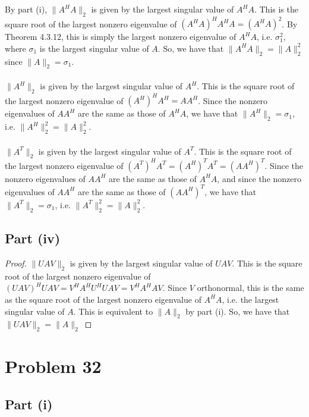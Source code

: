 \documentclass{article}
\begin{document}
By part (i), $\|A^{H}A\|_2$ is given by the largest singular value of $A^{H}A$. This is the square root of the largest nonzero eigenvalue of $(A^{H}A)^{H}A^{H}A = (A^{H}A)^2$. By Theorem 4.3.12, this is simply the largest nonzero eigenvalue of $A^{H}A$, i.e. $\sigma_1^2$, where $\sigma_1$ is the largest singular value of $A$. So, we have that $\|A^{H}A\|_2 = \|A\|_2^2$ since $\|A\|_2 = \sigma_1$. \\
\\
$\|A^{H}\|_2$ is given by the largest singular value of $A^{H}$. This is the square root of the largest nonzero eigenvalue of $(A^{H})^{H}A^{H} = AA^{H}$. Since the nonzero eigenvalues of  $AA^{H}$ are the same as those of $A^{H}A$, we have that $\|A^{H}\|_2 = \sigma_1$, i.e. $\|A^{H}\|_2^2 = \|A\|_2^2$. \\
\\
$\|A^{T}\|_2$ is given by the largest singular value of $A^{T}$. This is the square root of the largest nonzero eigenvalue of $(A^{T})^{H}A^{T} = (A^{H})^{T}A^{T} = (AA^{H})^{T}$. Since the nonzero eigenvalues of  $AA^{H}$ are the same as those of $A^{H}A$, and since the nonzero eigenvalues of $AA^{H}$ are the same as those of $(AA^{H})^{T}$, we have that $\|A^{T}\|_2 = \sigma_1$, i.e. $\|A^{T}\|_2^2 = \|A\|_2^2$. \\

\subsection*{Part (iv)}

\begin{proof}
$\|UAV\|_2$ is given by the largest singular value of $UAV$. This is the square root of the largest nonzero eigenvalue of $(UAV)^{H}UAV = V^{H}A^{H}U^{H}UAV = V^{H}A^{H}AV$. Since $V$ orthonormal, this is the same as the square root of the largest nonzero eigenvalue of $A^{H}A$, i.e. the largest singular value of $A$. This is equivalent to $\|A\|_2$ by part (i). So, we have that $\|UAV\|_2 = \|A\|_2$
\end{proof}

\section*{Problem 32}

\subsection*{Part (i)}
\end{document}
